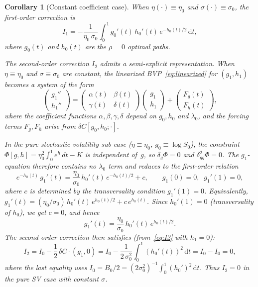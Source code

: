 \documentclass[11pt]{article}
\newtheorem{corollary}[theorem]{Corollary}
\theoremstyle{definition}
\newcommand{\dd}{\mathrm{d}}
\begin{document}
\begin{corollary}[Constant coefficient case]\label{cor:constant}
When $\eta(\cdot) \equiv \eta_0$ and $\sigma(\cdot) \equiv \sigma_0$, the first-order correction is
\begin{equation}\label{eq:I1_const}
  I_1 = -\frac{1}{\eta_0\,\sigma_0}\int_0^1 g_0'(t)\,h_0'(t)\,e^{-h_0(t)/2}\,\dd t,
\end{equation}
where $g_0(t)$ and $h_0(t)$ are the $\rho = 0$ optimal paths.

The second-order correction $I_2$ admits a semi-explicit representation. When $\eta \equiv \eta_0$ and $\sigma \equiv \sigma_0$ are constant, the linearized BVP~\eqref{eq:linearized} for $(g_1, h_1)$ becomes a system of the form
\begin{equation}\label{eq:const_BVP}
  \begin{pmatrix} g_1'' \\ h_1'' \end{pmatrix}
  = \begin{pmatrix} \alpha(t) & \beta(t) \\ \gamma(t) & \delta(t) \end{pmatrix}
    \begin{pmatrix} g_1 \\ h_1 \end{pmatrix}
  + \begin{pmatrix} F_g(t) \\ F_h(t) \end{pmatrix},
\end{equation}
where the coefficient functions $\alpha, \beta, \gamma, \delta$ depend on $g_0, h_0$ and $\lambda_0$, and the forcing terms $F_g, F_h$ arise from $\delta C[g_0, h_0; \cdot]$.

In the pure stochastic volatility sub-case ($\eta \equiv \eta_0$, $g_0 \equiv \log S_0$), the constraint $\Phi[g,h] = \eta_0^2\int_0^1 e^{h}\,dt - K$ is independent of~$g$, so $\delta_g\Phi = 0$ and $\delta^2_{gg}\Phi = 0$. The $g_1$-equation therefore contains no $\lambda_0$ term and reduces to the first-order relation
\begin{equation}\label{eq:g1_ODE}
  e^{-h_0(t)}\,g_1'(t) = \frac{\eta_0}{\sigma_0}\,h_0'(t)\,e^{-h_0(t)/2} + c,
  \qquad g_1(0) = 0,\;\; g_1'(1) = 0,
\end{equation}
where $c$ is determined by the transversality condition $g_1'(1) = 0$. Equivalently, $g_1'(t) = (\eta_0/\sigma_0)\,h_0'(t)\,e^{h_0(t)/2} + c\,e^{h_0(t)}$. Since $h_0'(1) = 0$ (transversality of $h_0$), we get $c = 0$, and hence
\begin{equation}\label{eq:g1_explicit}
  g_1'(t) = \frac{\eta_0}{\sigma_0}\,h_0'(t)\,e^{h_0(t)/2}.
\end{equation}
The second-order correction then satisfies (from~\eqref{eq:I2} with $h_1 = 0$):
\begin{equation}\label{eq:I2_const}
  I_2 = I_0 - \frac{1}{2}\,\delta C\cdot(g_1, 0) = I_0 - \frac{1}{2\,\sigma_0^2}\int_0^1 (h_0'(t))^2\,\dd t = I_0 - I_0 = 0,
\end{equation}
where the last equality uses $I_0 = B_0/2 = (2\sigma_0^2)^{-1}\int_0^1 (h_0')^2\,\dd t$. Thus $I_2 = 0$ in the pure SV case with constant $\sigma$.
\end{corollary}
\end{document}
